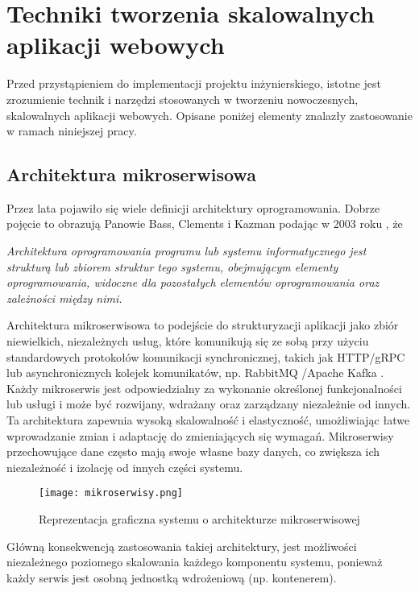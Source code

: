 \clearpage
\section{Techniki tworzenia skalowalnych aplikacji webowych}

Przed przystąpieniem do implementacji projektu inżynierskiego, istotne jest zrozumienie technik i narzędzi stosowanych w tworzeniu nowoczesnych, skalowalnych aplikacji webowych. Opisane poniżej elementy znalazły zastosowanie w ramach niniejszej pracy.

\subsection{Architektura mikroserwisowa}

Przez lata pojawiło się wiele definicji architektury oprogramowania. Dobrze pojęcie to obrazują Panowie Bass, Clements i Kazman podając w 2003 roku \cite{bass2012software}, że

\begin{displayquote}
\emph{Architektura oprogramowania programu lub systemu informatycznego jest strukturą lub zbiorem struktur tego systemu, obejmującym elementy oprogramowania, widoczne dla pozostałych elementów oprogramowania oraz zależności między nimi.}
\end{displayquote}

Architektura mikroserwisowa to podejście do strukturyzacji aplikacji jako zbiór niewielkich, niezależnych usług, które komunikują się ze sobą przy użyciu standardowych protokołów komunikacji synchronicznej, takich jak HTTP/gRPC \cite{grpc} lub asynchronicznych kolejek komunikatów, np. RabbitMQ \cite{rabbitmq}/Apache Kafka \cite{kafka}. Każdy mikroserwis jest odpowiedzialny za wykonanie określonej funkcjonalności lub usługi i może być rozwijany, wdrażany oraz zarządzany niezależnie od innych. Ta architektura zapewnia wysoką skalowalność i elastyczność, umożliwiając łatwe wprowadzanie zmian i adaptację do zmieniających się wymagań. Mikroserwisy przechowujące dane często mają swoje własne bazy danych, co zwiększa ich niezależność i izolację od innych części systemu.

\begin{figure}[!h]
    \centering \texttt{[image: mikroserwisy.png]}
    \caption{Reprezentacja graficzna systemu o architekturze mikroserwisowej \cite{rys1}}
\end{figure}


Główną konsekwencją zastosowania takiej architektury, jest możliwości niezależnego poziomego skalowania każdego komponentu systemu, ponieważ każdy serwis jest osobną jednostką wdrożeniową (np. kontenerem).

